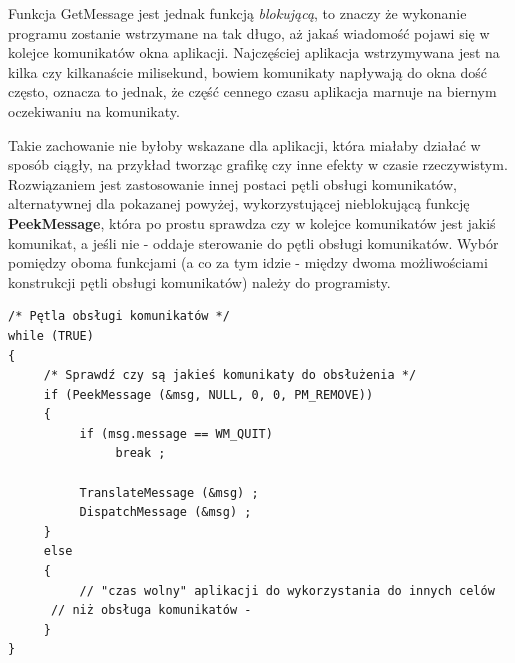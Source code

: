 Funkcja GetMessage jest jednak funkcją {\em blokującą}, to znaczy że wykonanie programu zostanie
wstrzymane na tak długo, aż jakaś wiadomość pojawi się w kolejce komunikatów okna aplikacji. 
Najczęściej aplikacja wstrzymywana jest na kilka czy kilkanaście milisekund, bowiem komunikaty 
napływają do okna dość często, oznacza to jednak, że część cennego czasu aplikacja marnuje
na biernym oczekiwaniu na komunikaty. 

Takie zachowanie nie byłoby wskazane dla aplikacji, która miałaby działać w sposób ciągły, na przykład
tworząc grafikę czy inne efekty w czasie rzeczywistym. Rozwiązaniem jest zastosowanie
innej postaci pętli obsługi komunikatów, alternatywnej dla pokazanej powyżej, wykorzystującej
nieblokującą funkcję {\bf PeekMessage}, która po prostu
sprawdza czy w kolejce komunikatów jest jakiś komunikat, a jeśli nie - oddaje sterowanie
do pętli obsługi komunikatów. Wybór pomiędzy oboma funkcjami (a co za tym idzie - między
dwoma możliwościami konstrukcji pętli obsługi komunikatów) należy do programisty.

\begin{scriptsize}
\begin{verbatim}
/* Pętla obsługi komunikatów */
while (TRUE)
{
     /* Sprawdź czy są jakieś komunikaty do obsłużenia */ 	
     if (PeekMessage (&msg, NULL, 0, 0, PM_REMOVE))
     {
          if (msg.message == WM_QUIT)
               break ;

          TranslateMessage (&msg) ;
          DispatchMessage (&msg) ;
     }
     else
     {
          // "czas wolny" aplikacji do wykorzystania do innych celów 
	  // niż obsługa komunikatów -
     }
}
\end{verbatim}
\end{scriptsize}
